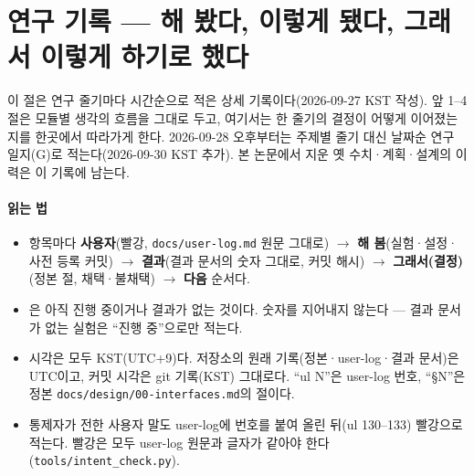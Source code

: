 \section{연구 기록 --- 해 봤다, 이렇게 됐다, 그래서 이렇게 하기로 했다}
\label{sec:record}

\noindent 이 절은 연구 줄기마다 시간순으로 적은 상세 기록이다(2026-09-27 KST 작성). 앞 1--4절은 모듈별 생각의 흐름을 그대로 두고, 여기서는 한 줄기의 결정이 어떻게 이어졌는지를 한곳에서 따라가게 한다. 2026-09-28 오후부터는 주제별 줄기 대신 날짜순 연구 일지(G)로 적는다(2026-09-30 KST 추가). 본 논문에서 지운 옛 수치·계획·설계의 이력은 이 기록에 남는다.

\paragraph{읽는 법}
\begin{itemize}
  \item 항목마다 \textbf{사용자}(빨강, \texttt{docs/user-log.md} 원문 그대로) $\rightarrow$ \textbf{해 봄}(실험·설정·사전 등록 커밋) $\rightarrow$ \textbf{결과}(결과 문서의 숫자 그대로, 커밋 해시) $\rightarrow$ \textbf{그래서(결정)}(정본 절, 채택·불채택) $\rightarrow$ \textbf{다음} 순서다.
  \item {}은 아직 진행 중이거나 결과가 없는 것이다. 숫자를 지어내지 않는다 --- 결과 문서가 없는 실험은 ``진행 중''으로만 적는다.
  \item 시각은 모두 KST(UTC+9)다. 저장소의 원래 기록(정본·user-log·결과 문서)은 UTC이고, 커밋 시각은 git 기록(KST) 그대로다. ``ul N''은 user-log 번호, ``§N''은 정본 \texttt{docs/design/00-interfaces.md}의 절이다.
  \item 통제자가 전한 사용자 말도 user-log에 번호를 붙여 올린 뒤(ul 130--133) 빨강으로 적는다. 빨강은 모두 user-log 원문과 글자가 같아야 한다(\texttt{tools/intent\_check.py}).
\end{itemize}








